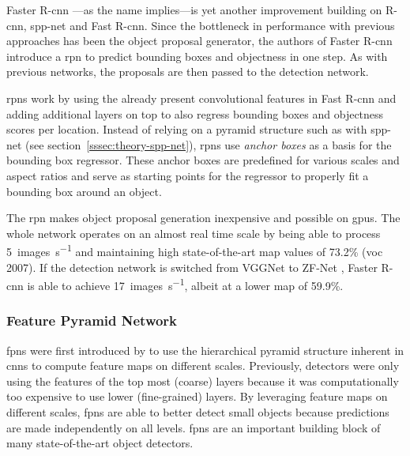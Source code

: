 \documentclass[draft,final]{vutinfth} %
\begin{document}
Faster R-\gls{cnn} \cite{ren2015,ren2017}—as the name implies—is yet
another improvement building on R-\gls{cnn}, \gls{spp}-net and Fast
R-\gls{cnn}. Since the bottleneck in performance with previous
approaches has been the object proposal generator, the authors of
Faster R-\gls{cnn} introduce a \gls{rpn} to predict bounding boxes and
objectness in one step. As with previous networks, the proposals are
then passed to the detection network.

\glspl{rpn} work by using the already present convolutional features
in Fast R-\gls{cnn} and adding additional layers on top to also
regress bounding boxes and objectness scores per location. Instead of
relying on a pyramid structure such as with \gls{spp}-net (see
section~\ref{sssec:theory-spp-net}), \glspl{rpn} use \emph{anchor
boxes} as a basis for the bounding box regressor. These anchor boxes
are predefined for various scales and aspect ratios and serve as
starting points for the regressor to properly fit a bounding box
around an object.

The \gls{rpn} makes object proposal generation inexpensive and
possible on \glspl{gpu}. The whole network operates on an almost real
time scale by being able to process \qty{5}{images\per\s} and
maintaining high state-of-the-art \gls{map} values of 73.2\%
(\gls{voc} 2007). If the detection network is switched from VGGNet
\cite{liu2015} to ZF-Net \cite{zeiler2014}, Faster R-\gls{cnn} is able
to achieve \qty{17}{images\per\s}, albeit at a lower \gls{map} of
59.9\%.

\subsubsection{Feature Pyramid Network}
\label{sssec:theory-fpn}

\glspl{fpn} were first introduced by \textcite{lin2017} to use the
hierarchical pyramid structure inherent in \glspl{cnn} to compute
feature maps on different scales. Previously, detectors were only
using the features of the top most (coarse) layers because it was
computationally too expensive to use lower (fine-grained) layers. By
leveraging feature maps on different scales, \glspl{fpn} are able to
better detect small objects because predictions are made independently
on all levels. \glspl{fpn} are an important building block of many
state-of-the-art object detectors.
\end{document}
